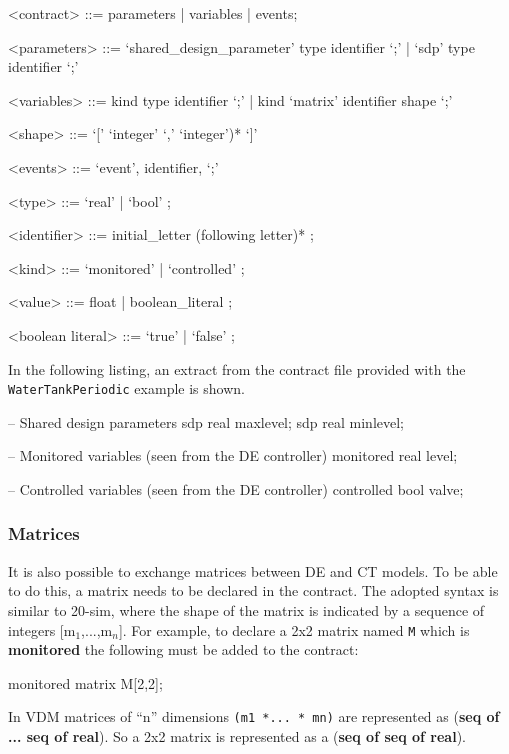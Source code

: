 \documentclass{crescendorepchap}
\newcommand{\vdmkeyw}[1]{{\bf\ttfamily #1}}
\begin{document}
\begin{grammar}
<contract> ::= parameters | variables | events;

<parameters> ::= `shared\_design\_parameter' type identifier `;'
             |   `sdp' type identifier `;'

<variables> ::= kind type identifier `;' 
            |   kind `matrix' identifier shape `;'

<shape> ::= `[' `integer' `,' `integer')* `]' 

<events> ::= `event', identifier, `;'

<type> ::= `real' | `bool' ;

<identifier> ::= initial\_letter (following letter)* ;

<kind> ::= `monitored' | `controlled' ;

<value> ::= float | boolean\_literal ;

<boolean literal> ::= `true' | `false' ;
\end{grammar}

In the following listing, an extract from the contract file provided
with the \texttt{Water\-Tank\-Periodic} example is shown.

\begin{dcl}
-- Shared design parameters
sdp real maxlevel;
sdp real minlevel; 

-- Monitored variables (seen from the DE controller)
monitored real level;

-- Controlled variables (seen from the DE controller)
controlled bool valve; 
\end{dcl}

\subsubsection{Matrices}

It is also possible to exchange matrices
between DE and CT models. To be able to do this, a matrix needs to be
declared in the contract. The adopted syntax is similar to 20-sim, where
the shape of the matrix is indicated by a sequence of integers
{[}m$_1$,...,m$_n${]}. For example, to declare
a 2x2 matrix named \texttt{M} which is \vdmkeyw{monitored} the following must be
added to the contract:

\begin{dcl}
monitored matrix M[2,2];
\end{dcl}

In VDM matrices of ``n'' dimensions
\texttt{(m1 *... * mn)} are
represented as (\vdmkeyw{seq of ... seq of real}). So a 2x2 matrix is
represented as a (\vdmkeyw{seq of seq of
real}).
\end{document}

